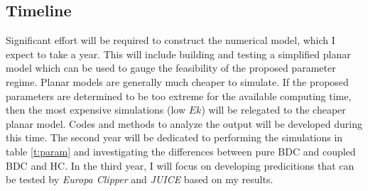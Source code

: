 \documentclass[12pt]{article}
\begin{document}
 \subsection{Timeline}
 Significant effort will be required to construct the numerical model, which I expect to take a year. This will include building and testing a simplified planar model which can be used to gauge the feasibility of the proposed parameter regime. Planar models are generally much cheaper to simulate. If the proposed parameters are determined to be too extreme for the available computing time, then the most expensive simulations (low $Ek$) will be relegated to the cheaper planar model. Codes and methods to analyze the output will be developed during this time. The second year will be dedicated to performing the simulations in table \ref{t:param} and investigating the differences between pure BDC and coupled BDC and HC. In the third year, I will focus on developing predicitions that can be tested by \textit{Europa Clipper} and \textit{JUICE} based on my results.%

\end{document}
